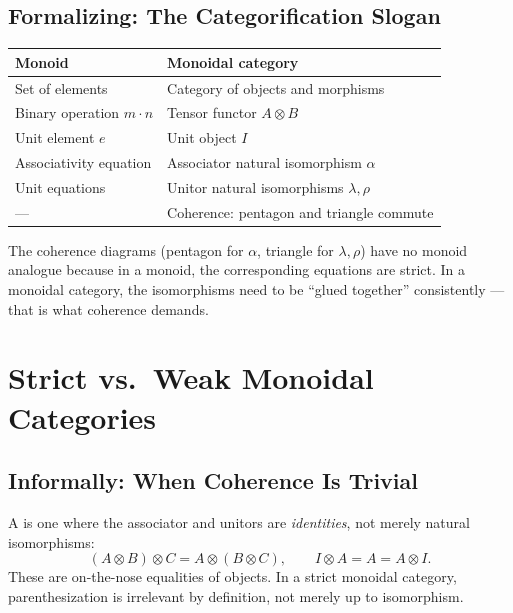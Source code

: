\subsection{Formalizing: The Categorification Slogan}

\begin{center}
\begin{tabular}{ll}
\textbf{Monoid} & \textbf{Monoidal category} \\
\hline
Set of elements & Category of objects and morphisms \\
Binary operation $m \cdot n$ & Tensor functor $A \otimes B$ \\
Unit element $e$ & Unit object $I$ \\
Associativity equation & Associator natural isomorphism $\alpha$ \\
Unit equations & Unitor natural isomorphisms $\lambda, \rho$ \\
--- & Coherence: pentagon and triangle commute \\
\end{tabular}
\end{center}

The coherence diagrams (pentagon for $\alpha$, triangle for $\lambda, \rho$)
have no monoid analogue because in a monoid, the corresponding equations are
strict. In a monoidal category, the isomorphisms need to be ``glued together''
consistently --- that is what coherence demands.


\section{Strict vs.\ Weak Monoidal Categories}
\label{sec:strict-vs-weak}

\subsection{Informally: When Coherence Is Trivial}

A  is one where the associator and unitors are
\emph{identities}, not merely natural isomorphisms:
\begin{equation*}
  (A \otimes B) \otimes C = A \otimes (B \otimes C), \qquad
  I \otimes A = A = A \otimes I.
\end{equation*}
These are on-the-nose equalities of objects. In a strict monoidal category,
parenthesization is irrelevant by definition, not merely up to isomorphism.

